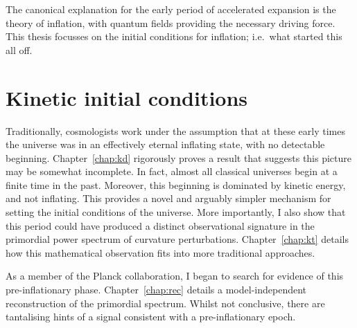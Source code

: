 The canonical explanation for the early period of accelerated expansion is the theory of inflation, with quantum fields providing the necessary driving force. This thesis focusses on the initial conditions for inflation; i.e.\ what started this all off.

\section{Kinetic initial conditions}

Traditionally, cosmologists work under the assumption that at these early times the universe was in an effectively eternal inflating state, with no detectable beginning. Chapter~\ref{chap:kd} rigorously proves a result that suggests this picture may be somewhat incomplete. In fact, almost all classical universes begin at a finite time in the past. Moreover, this beginning is dominated by kinetic energy, and not inflating. This provides a novel and arguably simpler mechanism for setting the initial conditions of the universe. More importantly, I also show that this period could have produced a distinct observational signature in the primordial power spectrum of curvature perturbations. Chapter~\ref{chap:kt} details how this mathematical observation fits into more traditional approaches.

As a member of the Planck collaboration, I began to search for evidence of this pre-inflationary phase. Chapter~\ref{chap:rec} details a model-independent reconstruction of the primordial spectrum. Whilst not conclusive, there are tantalising hints of a signal consistent with a pre-inflationary epoch.

